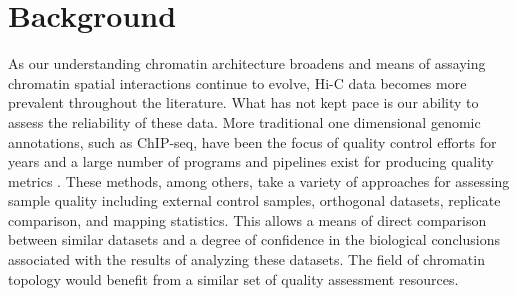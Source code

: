 \section{Background}

As our understanding chromatin architecture broadens and means of assaying chromatin spatial interactions continue to evolve, Hi-C data becomes more prevalent throughout the literature. What has not kept pace is our ability to assess the reliability of these data. More traditional one dimensional genomic annotations, such as ChIP-seq, have been the focus of quality control efforts for years and a large number of programs and pipelines exist for producing quality metrics \cite{landt_chip-seq_2012,planet_htseqtools:_2012,diaz_chance:_2012, carroll_impact_2014,marinov_large-scale_2014,qin_chilin:_2016}. These methods, among others, take a variety of approaches for assessing sample quality including external control samples, orthogonal datasets, replicate comparison, and mapping statistics. This allows a means of direct comparison between similar datasets and a degree of confidence in the biological conclusions associated with the results of analyzing these datasets. The field of chromatin topology would benefit from a similar set of quality assessment resources.

